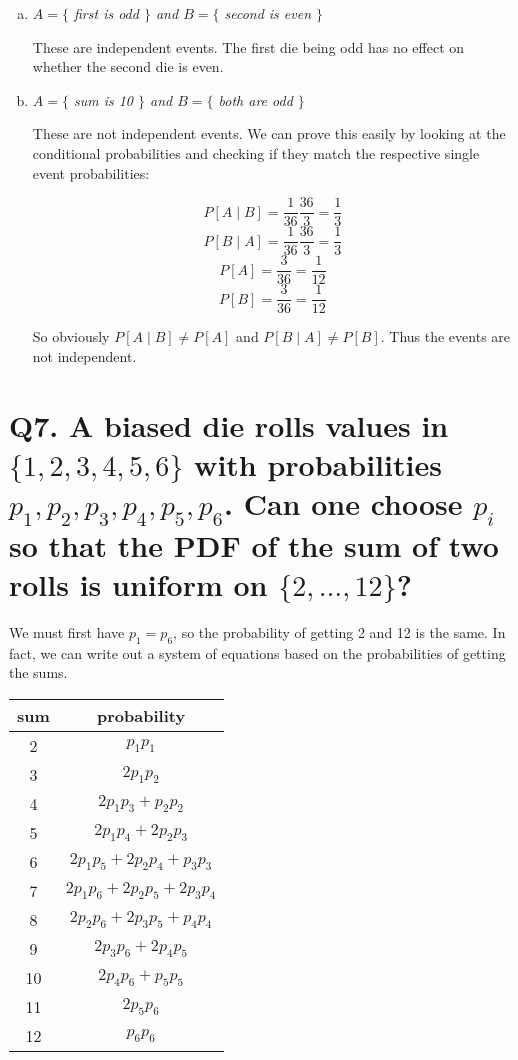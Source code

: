 \documentclass{article}
\begin{document}
\begin{enumerate}[(a)]
  \item \textit{$A = \{$ first is odd $\}$ and $B = \{$ second is even $\}$}

    These are independent events. The first die being odd has no effect on whether the second die is even.
  \item \textit{$A = \{$ sum is 10 $\}$ and $B = \{$ both are odd $\}$}

    These are not independent events. We can prove this easily by looking at the conditional probabilities and checking if they match the respective single event probabilities:

    $$P[A\mid B] = \frac{1}{36}\frac{36}{3} = \frac{1}{3}$$
    $$P[B\mid A] = \frac{1}{36}\frac{36}{3} = \frac{1}{3}$$
    $$P[A] = \frac{3}{36} = \frac{1}{12}$$
    $$P[B] = \frac{3}{36} = \frac{1}{12}$$

    So obviously $P[A\mid B] \neq P[A]$ and $P[B \mid A] \neq P[B]$. Thus the events are not independent.

\end{enumerate}





\section*{Q7. \normalsize A biased die rolls values in $\{1,2,3,4,5,6\}$ with probabilities $p_1, p_2, p_3, p_4, p_5, p_6$. Can one choose $p_i$ so that the PDF of the sum of two rolls is uniform on $\{2,\dots,12\}$?}

We must first have $p_1 = p_6$, so the probability of getting 2 and 12 is the same. In fact, we can write out a system of equations based on the probabilities of getting the sums.

\begin{table}[h!]
  \centering
  \begin{tabular} {c | c}
    sum & probability \\ [0.5ex]
    \hline
    2 & $p_1p_1$\\
    3 & $2p_1p_2$\\
    4 & $2p_1p_3 + p_2p_2$\\
    5 & $2p_1p_4 + 2p_2p_3$\\
    6 & $2p_1p_5 + 2p_2p_4 + p_3p_3$\\
    7 & $2p_1p_6 + 2p_2p_5 + 2p_3p_4$\\
    8 & $2p_2p_6 + 2p_3p_5 + p_4p_4$\\
    9 & $2p_3p_6 + 2p_4p_5$\\
    10 & $2p_4p_6 + p_5p_5$\\
    11 & $2p_5p_6$\\
    12 & $p_6p_6$\\
  \end{tabular}
\end{table}
\end{document}

